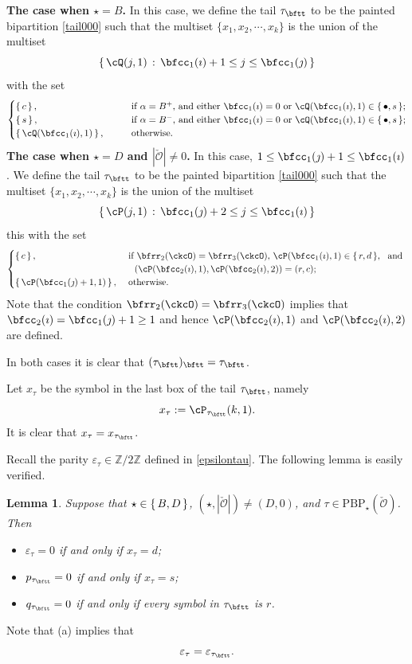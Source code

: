 \documentclass[11pt,a4paper]{amsart}
\def\abs#1{\left|{#1}\right|}
\newcommand{\CO}{{\mathcal {O}}}
\newcommand{\Z}{\mathbb{Z}}
\newcommand{\be}{\begin {equation}}
\newcommand{\ee}{\end {equation}}
\numberwithin{equation}{section}
\newtheorem{lem}[thm]{Lemma}
\theoremstyle{remark}
\begin{document}
{\bf The case when $\star = B$.}
In this case, we define the tail $\tau_\bftt$ to be the  painted bipartition  \eqref{tail000} such that the multiset $\{x_1, x_2, \cdots, x_k\}$ is the
union of the multiset
\[
  \set{\cQ(j,1)\,:\, \bfcc_{1}(\imath)+1 \leq j \leq  \bfcc_{1}(\jmath) }
\]
with the set
\[
  \begin{cases}
 \set{c}, &
 \qquad
  \text{if $\alpha = B^+$, and either $\bfcc_{1}(\imath)=0$ or $\cQ(\bfcc_{1}(\imath),1)\in \set{\bullet,s}$};  \\
 \set{s},&
  \qquad \text{if $\alpha = B^-$, and either $\bfcc_{1}(\imath)=0$ or $\cQ(\bfcc_{1}(\imath),1)\in \set{\bullet,s}$}; \\
\set{\cQ(\bfcc_{1}(\imath),1)},&
\qquad
\text{otherwise.}
\end{cases}
\]
{\bf The case when $\star = D$ and $\abs{\check \CO}\neq 0$.}
In this case, $1\leq \bfcc_1(\jmath)+1\leq \bfcc_1(\imath)$.  We define the tail $\tau_\bftt$ to be the  painted
bipartition  \eqref{tail000} such that the multiset $\{x_1, x_2, \cdots, x_k\}$
is the union of the multiset
\[
\set{\cP(j,1)\,:\, \bfcc_{1}(\jmath)+2 \leq j \leq \bfcc_{1}(\imath)}
\]
this
with the set
\[
\begin{cases}
    \set{c},                          &
    \ \text{if $\bfrr_2(\ckcO)=\bfrr_3(\ckcO)$, $\cP(\bfcc_1(\imath),1)\in \set{r,d}$}, \  \text{ and }                                   \\
     & \quad   (\cP(\bfcc_{2}(\imath),1) ,\cP(\bfcc_{2}(\imath),2)) = (r,c);  \\
    \set{\cP(\bfcc_{1}(\jmath)+1,1)}, &
    \    \text{otherwise.}
  \end{cases}
\]
Note that the condition $\bfrr_2(\ckcO)=\bfrr_3(\ckcO)$ implies that $ \bfcc_2(\imath)=\bfcc_{1}(\jmath)+1\geq 1 $ and hence $\cP(\bfcc_{2}(\imath),1)$ and $\cP(\bfcc_{2}(\imath),2)$ are defined.



In both cases it is clear that $(\tau_\bftt)_\bftt=\tau_\bftt$.

Let $x_{\tau}$ be the symbol in the last box of the tail $\tau_\bftt$, namely
\be\label{xtau}
x_\tau := \cP_{\tau_\bftt}(k,1).
\ee
It is clear that $x_\tau=x_{\tau_\bftt}$.

Recall the parity $\varepsilon_\tau\in \Z/2\Z$ defined in \eqref{epsilontau}. The following  lemma is  easily verified.

\begin{lem}\label{eptail}
Suppose that $\star \in \set{B,D}$, $(\star, \abs{\check \CO})\neq (D, 0)$, and  $\tau\in
\mathrm{PBP}_\star(\check \CO)$. Then \begin{itemize}
    \item $\varepsilon_\tau=0$ if and only if $x_\tau=d$;
    \item $p_{\tau_\bftt}=0$ if and only if $x_\tau=s$;
    \item $q_{\tau_\bftt}=0$ if and only if every symbol in $\tau_\bftt$ is $r$.
\end{itemize}
\end{lem}
 Note that  (a) implies that  \[
 \varepsilon_\tau=\varepsilon_{\tau_\bftt}.
 \]
\end{document}
